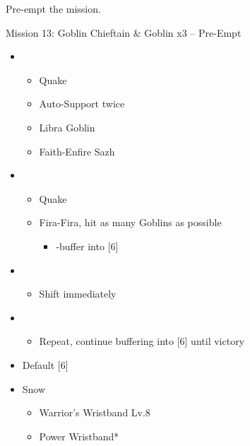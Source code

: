 Pre-empt the mission.
\vfill
\begin{battle}{Mission 13: Goblin Chieftain \& Goblin x3 -- Pre-Empt}
	\begin{itemize}
		\item \third
			\begin{itemize}
				\item Quake
				\item Auto-Support twice
				\item Libra Goblin
				\item Faith-Enfire Sazh
			\end{itemize}
		\item \second
			\begin{itemize}
				\item Quake
				\item Fira-Fira, hit as many Goblins as possible
					\begin{itemize}
						\item \com-buffer into [6]
					\end{itemize}
			\end{itemize}
		\item \sixth
			\begin{itemize}
				\item Shift immediately
			\end{itemize}
		\item \second
			\begin{itemize}
				\item Repeat, continue buffering into [6] until victory
			\end{itemize}
	\end{itemize}
\end{battle}

\begin{menu}
	\begin{itemize}
		\paradigm
		\begin{itemize}
			\item Default [6]
		\end{itemize}
		\equip
		\begin{itemize}
			\item Snow
			      \begin{itemize}
				      \item Warrior's Wristband Lv.8
				      \item Power Wristband*
			      \end{itemize}
		\end{itemize}
	\end{itemize}
\end{menu}

